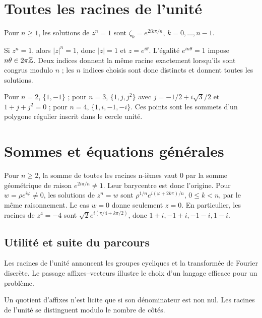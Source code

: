 \documentclass[../cours_tle.tex]{subfiles}
\begin{document}
\section{Toutes les racines de l'unité}
\begin{theoreme}
Pour $n\ge1$, les solutions de $z^n=1$ sont
$\zeta_k=e^{2ik\pi/n}$, $k=0,\ldots,n-1$.
\end{theoreme}
\begin{demonstration}
Si $z^n=1$, alors $|z|^n=1$, donc $|z|=1$ et $z=e^{i\theta}$.
L'égalité $e^{in\theta}=1$ impose $n\theta\in2\pi\mathbb{Z}$.
Deux indices donnent la même racine exactement lorsqu'ils sont congrus modulo $n$ ; les $n$ indices choisis sont donc distincts et donnent toutes les solutions.
\end{demonstration}
Pour $n=2$, $\{1,-1\}$ ; pour $n=3$, $\{1,j,j^2\}$ avec $j=-1/2+i\sqrt3/2$ et $1+j+j^2=0$ ; pour $n=4$, $\{1,i,-1,-i\}$.
Ces points sont les sommets d'un polygone régulier inscrit dans le cercle unité.
\begin{center}
\end{center}
\section{Sommes et équations générales}
Pour $n\ge2$, la somme de toutes les racines n-ièmes vaut $0$ par la somme géométrique de raison $e^{2i\pi/n}\ne1$. Leur barycentre est donc l'origine.
Pour $w=\rho e^{i\varphi}\ne0$, les solutions de $z^n=w$ sont
$\rho^{1/n}e^{i(\varphi+2k\pi)/n}$, $0\le k<n$, par le même raisonnement.
Le cas $w=0$ donne seulement $z=0$.
En particulier, les racines de $z^4=-4$ sont $\sqrt2 e^{i(\pi/4+k\pi/2)}$, donc $1+i,-1+i,-1-i,1-i$.
\begin{finchapitre}
\section{Utilité et suite du parcours}
Les racines de l'unité annoncent les groupes cycliques et la transformée de Fourier discrète. Le passage affixes–vecteurs illustre le choix d'un langage efficace pour un problème.
\begin{retenir}
Un quotient d'affixes n'est licite que si son dénominateur est non nul. Les racines de l'unité se distinguent modulo le nombre de côtés.
\end{retenir}
\end{finchapitre}
\end{document}
